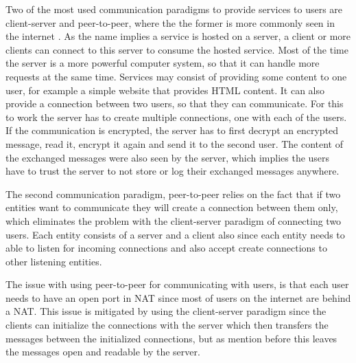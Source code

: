 Two of the most used communication paradigms to provide services to users are client-server and peer-to-peer, where the the former is more commonly seen in the internet \cite{Forouzan2010}. As the name implies a service is hosted on a server, a client or more clients can connect to this server to consume the hosted service. Most of the time the server is a more powerful computer system, so that it can handle more requests at the same time. Services may consist of providing some content to one user, for example a simple website that provides HTML content. It can also provide a connection between two users, so that they can communicate. For this to work the server has to create multiple connections, one with each of the users. If the communication is encrypted, the server has to first decrypt an encrypted message, read it, encrypt it again and send it to the second user. The content of the exchanged messages were also seen by the server, which implies the users have to trust the server to not store or log their exchanged messages anywhere.

The second communication paradigm, peer-to-peer relies on the fact that if two entities want to communicate they will create a connection between them only, which eliminates the problem with the client-server paradigm of connecting two users. Each entity consists of a server and a client also since each entity needs to able to listen for incoming connections and also accept create connections to other listening entities.

The issue with using peer-to-peer for communicating with users, is that each user needs to have an open port in NAT since most of users on the internet are behind a NAT. This issue is mitigated by using the client-server paradigm since the clients can initialize the connections with the server which then transfers the messages between the initialized connections, but as mention before this leaves the messages open and readable by the server. 

